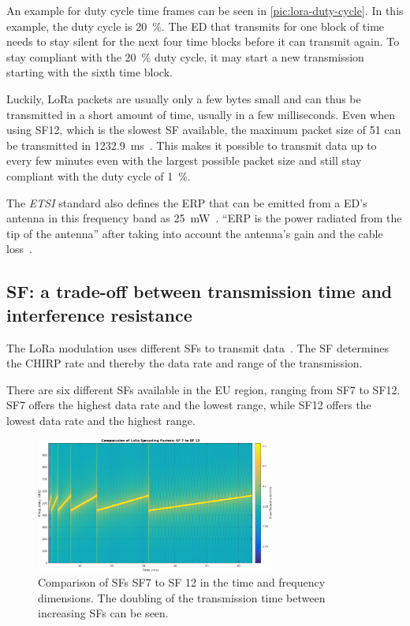 An example for duty cycle time frames can be seen in \cref{pic:lora-duty-cycle}.
In this example, the duty cycle is \SI{20}{\percent}.
The \acl{ED} that transmits for one block of time needs to stay silent for the next four time blocks before it can transmit again.
To stay compliant with the \SI{20}{\percent} duty cycle, it may start a new transmission starting with the sixth time block.

Luckily, LoRa packets are usually only a few bytes small and can thus be transmitted in a short amount of time, usually in a few milliseconds.
Even when using \acs{SF}12, which is the slowest \acs{SF} available, the maximum packet size of \SI{51}{\byte} can be transmitted in  \SI{1232.9}{\milli\second}~\cite[p. 6]{the_things_network_lorawan_nodate}\cite[p. 10f]{lora_alliance_inc_lorawan_regional_2017}.
This makes it possible to transmit data up to every few minutes even with the largest possible packet size and still stay compliant with the duty cycle of \SI{1}{\percent}.

The \emph{ETSI} standard also defines the \acf{ERP} that can be emitted from a \acl{ED}'s antenna in this frequency band as \SI{25}{\milli\watt}~\cite[p. 29]{etsi_etsi_2012}.
``\ac{ERP} is the power radiated from the tip of the antenna'' after taking into account the antenna's gain and the cable loss~\cite[p. 23]{faruque_radio_2015}.

\subsection{\acl{SF}: a trade-off between transmission time and interference resistance}\label{sec:spreading-factors}

The \ac{LoRa} modulation uses different \aclp{SF} to transmit data~\cite{the_things_network_spreading_2023}.
The \acl{SF} determines the \ac{CHIRP} rate and thereby the data rate and range of the transmission.

There are six different \aclp{SF} available in the \ac{EU} region, ranging from \ac{SF}7 to \ac{SF}12.
\ac{SF}7 offers the highest data rate and the lowest range, while \ac{SF}12 offers the lowest data rate and the highest range.

\begin{figure}[htbp]
    \centering
    \includegraphics[width=0.7\textwidth]{pictures/lora/SF_Comparison_7_12.png}
    \caption{
        Comparison of \aclp{SF} \ac{SF}7 to \ac{SF} 12 in the time and frequency dimensions.
        The doubling of the transmission time between increasing \aclp{SF} can be seen.\protect\cite{sakshama_ghoslya_lora_2017}
    }\label{pic:lora-sf-comparison}
\end{figure}

